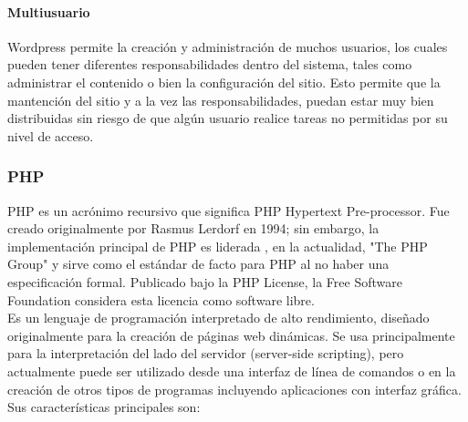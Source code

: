 \paragraph{Multiusuario}
Wordpress permite la creación y administración de muchos usuarios, los cuales pueden tener diferentes responsabilidades dentro del sistema, tales como administrar el contenido o bien la configuración del sitio. Esto permite que la mantención del sitio y a la vez las responsabilidades, puedan estar muy bien distribuidas sin riesgo de que algún usuario realice tareas no permitidas por su nivel de acceso.

\subsubsection{PHP}
PHP es un acrónimo recursivo que significa PHP Hypertext Pre-processor. Fue creado originalmente por Rasmus Lerdorf en 1994; sin embargo, la implementación principal de PHP es liderada , en la actualidad, "The PHP Group\cite{php:1}" y sirve como el estándar de facto para PHP al no haber una especificación formal. Publicado bajo la PHP License, la Free Software Foundation considera esta licencia como software libre.\\

Es un lenguaje de programación interpretado de alto rendimiento, diseñado originalmente para la creación de páginas web dinámicas. Se usa principalmente para la interpretación del lado del servidor (server-side scripting), pero actualmente puede ser utilizado desde una interfaz de línea de comandos o en la creación de otros tipos de programas incluyendo aplicaciones con interfaz gráfica. Sus características principales son:


